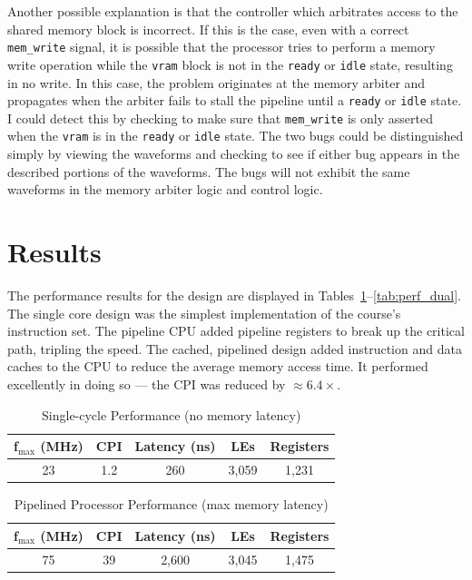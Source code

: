 \documentclass[12pt]{article}
\begin{document}
Another possible explanation is that the controller which arbitrates access to the shared memory block is incorrect. If this is the case, even with a correct \texttt{mem\_write} signal, it is possible that the processor tries to perform a memory write operation while the \texttt{vram} block is not in the \texttt{ready} or \texttt{idle} state, resulting in no write. In this case, the problem originates at the memory arbiter and propagates when the arbiter fails to stall the pipeline until a \texttt{ready} or \texttt{idle} state. I could detect this by checking to make sure that \texttt{mem\_write} is only asserted when the \texttt{vram} is in the \texttt{ready} or \texttt{idle} state. The two bugs could be distinguished simply by viewing the waveforms and checking to see if either bug appears in the described portions of the waveforms. The bugs will not exhibit the same waveforms in the memory arbiter logic and control logic.\\

\newpage
  \section{Results}
  
The performance results for the design are displayed in Tables~\ref{tab:perf_single}--\ref{tab:perf_dual}. The single core design was the simplest implementation of the course's instruction set. The pipeline CPU added pipeline registers to break up the critical path, tripling the speed. The cached, pipelined design added instruction and data caches to the CPU to reduce the average memory access time. It performed excellently in doing so --- the CPI was reduced by $\approx 6.4 \times$.\\

\begin{table}
\begin{center}

  \caption{Single-cycle Performance (no memory latency)}
  \begin{tabular}{| c | c | c | c | c |}
  \hline
  f$_{\textrm{max}}$ (MHz) & CPI & Latency (ns) & LEs & Registers \\ \hline
 23 & 1.2 & 260 & 3,059 & 1,231 \\ \hline
  \end{tabular}
  \end{center}

  \label{tab:perf_single}
\end{table}

\begin{table}
\begin{center}

  \caption{Pipelined Processor Performance (max memory latency)}
  \begin{tabular}{| c | c | c | c | c |}
  \hline
  f$_{\textrm{max}}$ (MHz) & CPI & Latency (ns) & LEs & Registers \\ \hline
 75 & 39 & 2,600 &  3,045 & 1,475 \\ \hline
  \end{tabular}
  \end{center}

  \label{tab:perf_pipe}
\end{table}
\end{document}
